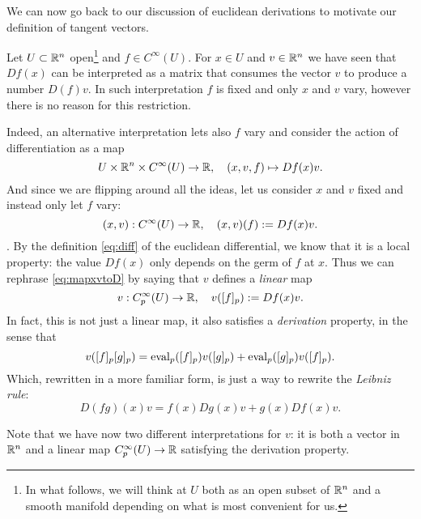 We can now go back to our discussion of euclidean derivations to motivate our definition of tangent vectors.

\begin{ex}\label{ex:euclideanD}
    Let $U\subset\mathbb{R}^n$ open\footnote{In what follows, we will think at $U$ both as an open subset of $\mathbb{R}^n$ and a smooth manifold depending on what is most convenient for us.} and $f\in C^\infty(U)$.
    For $x\in U$ and $v\in\mathbb{R}^n$ we have seen that $Df(x)$ can be interpreted as a matrix that consumes the vector $v$ to produce a number $D(f)v$.
    In such interpretation $f$ is fixed and only $x$ and $v$ vary, however there is no reason for this restriction.

    Indeed, an alternative interpretation lets also $f$ vary and consider the action of differentiation as a map
    \begin{equation}
        U \times \mathbb{R}^n \times C^\infty(U) \to \mathbb{R},\quad
        (x,v,f) \mapsto Df(x) v.
    \end{equation}
    And since we are flipping around all the ideas, let us consider $x$ and $v$ fixed and instead only let $f$ vary:
    \begin{equation}\label{eq:mapxvtoD}
        (x,v):C^\infty(U) \to\mathbb{R}, \quad (x,v)(f) := Df(x)v.
    \end{equation}.
    By the definition \eqref{eq:diff} of the euclidean differential, we know that it is a local property: the value $Df(x)$ only depends on the germ of $f$ at $x$.
    Thus we can rephrase \eqref{eq:mapxvtoD} by saying that $v$ defines a \emph{linear} map
    \begin{equation}
        v : C_p^\infty(U) \to \mathbb{R}, \quad
        v([f]_p) := Df(x) v.
    \end{equation}
    In fact, this is not just a linear map, it also satisfies a \emph{derivation} property, in the sense that
    \begin{equation}
        v([f]_p [g]_p) =
            \operatorname{eval}_p([f]_p)v([g]_p)
            + \operatorname{eval}_p([g]_p)v([f]_p).
    \end{equation}
    Which, rewritten in a more familiar form, is just a way to rewrite the \emph{Leibniz rule}:
    \begin{equation}
        D(fg)(x) v = f(x)Dg(x)v + g(x) Df(x)v.
    \end{equation}

    Note that we have now two different interpretations for $v$: it is both a vector in $\mathbb{R}^n$ and a linear map $C_p^\infty(U) \to \mathbb{R}$ satisfying the derivation property.
\end{ex}

